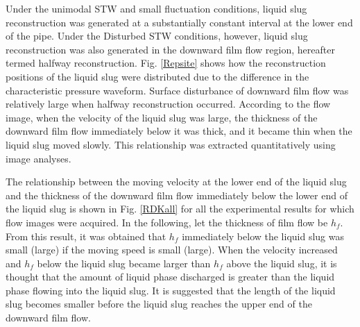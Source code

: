 \documentclass[aps,pre,preprint,groupedaddress,showkeys]{revtex4-2}
\begin{document}
Under the unimodal STW and small fluctuation conditions, liquid slug reconstruction was generated at a substantially constant interval at the lower end of the pipe. 
Under the Disturbed STW conditions, however, liquid slug reconstruction was also generated in the downward film flow region, hereafter termed halfway reconstruction.
Fig. \ref{Repsite} shows how the reconstruction positions of the liquid slug were distributed due to the difference in the characteristic pressure waveform.
Surface disturbance of downward film flow was relatively large when halfway reconstruction occurred.
According to the flow image, when the velocity of the liquid slug was large, the thickness of the downward film flow immediately below it was thick, and it became thin when the liquid slug moved slowly.
This relationship was extracted quantitatively using image analyses.

The relationship between the moving velocity at the lower end of the liquid slug and the thickness of the downward film flow immediately below the lower end of the liquid slug is shown in Fig. \ref{RDKall} for all the experimental results for which flow images were acquired.
In the following, let the thickness of film flow be $h_f$.
From this result, it was obtained that $h_f$ immediately below the liquid slug was small (large) if the moving speed is small (large).
When the velocity increased and $h_f$ below the liquid slug became larger than $h_f$ above the liquid slug, it is thought that the amount of liquid phase discharged is greater than the liquid phase flowing into the liquid slug.
It is suggested that the length of the liquid slug becomes smaller before the liquid slug reaches the upper end of the downward film flow.
\end{document}

